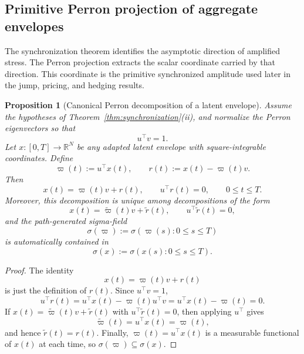 \documentclass[11pt,a4paper]{amsart}
\theoremstyle{plain}
\newtheorem{proposition}[theorem]{Proposition}
\theoremstyle{definition}
\theoremstyle{remark}
\newcommand{\R}{\mathbb{R}}
\begin{document}
\subsection{Primitive Perron projection of aggregate envelopes}\label{subsec:perron-projection}

The synchronization theorem identifies the asymptotic direction of amplified stress.  The Perron
projection extracts the scalar coordinate carried by that direction.  This coordinate is the
primitive synchronized amplitude used later in the jump, pricing, and hedging results.

\begin{proposition}[Canonical Perron decomposition of a latent envelope]\label{prop:perron-envelope}
Assume the hypotheses of Theorem~\ref{thm:synchronization}(ii), and normalize the Perron
eigenvectors so that
\[
        u^\top v=1.
\]
Let \(x\colon[0,T]\to\R^N\) be any adapted latent envelope with square-integrable coordinates.
Define
\[
        \varpi(t):=u^\top x(t),
        \qquad
        r(t):=x(t)-\varpi(t)v.
\]
Then
\[
        x(t)=\varpi(t)v+r(t),
        \qquad
        u^\top r(t)=0,
        \qquad
        0\le t\le T.
\]
Moreover, this decomposition is unique among decompositions of the form
\[
        x(t)=\widetilde\varpi(t)v+\widetilde r(t),
        \qquad
        u^\top \widetilde r(t)=0,
\]
and the path-generated sigma-field
\[
        \sigma(\varpi):=\sigma(\varpi(s):0\le s\le T)
\]
is automatically contained in
\[
        \sigma(x):=\sigma(x(s):0\le s\le T).
\]
\end{proposition}

\begin{proof}
The identity
\[
        x(t)=\varpi(t)v+r(t)
\]
is just the definition of \(r(t)\).  Since \(u^\top v=1\),
\[
        u^\top r(t)
        =
        u^\top x(t)-\varpi(t)u^\top v
        =
        u^\top x(t)-\varpi(t)
        =
        0.
\]
If \(x(t)=\widetilde\varpi(t)v+\widetilde r(t)\) with \(u^\top \widetilde r(t)=0\), then applying
\(u^\top\) gives
\[
        \widetilde\varpi(t)=u^\top x(t)=\varpi(t),
\]
and hence \(\widetilde r(t)=r(t)\).  Finally, \(\varpi(t)=u^\top x(t)\) is a measurable
functional of \(x(t)\) at each time, so \(\sigma(\varpi)\subseteq \sigma(x)\).
\end{proof}
\end{document}
